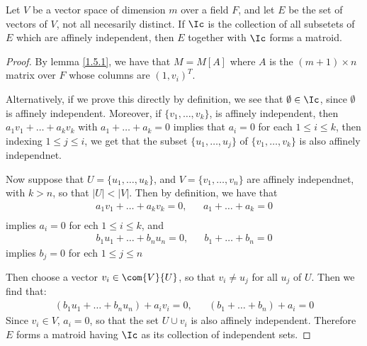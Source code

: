 \begin{lemma}\label{1.5.2}
    Let $V$ be a vector space of dimension $m$ over a field $F$, and let  $E$
    be the set of vectors of $V$, not all necesarily distinct. If $\Ic$ is the
    collection of all subsetets of  $E$ which are affinely independent, then
    $E$ together with  $\Ic$ forms a matroid.
\end{lemma}
\begin{proof}
    By lemma \ref{1.5.1}, we have that $M=M[A]$ where $A$ is the  $(m+1) \times
    n$ matrix over $F$ whose columns are  $(1,v_i)^T$.

    Alternatively, if we prove this directly by definition, we see that
    $\emptyset \in \Ic$, since  $\emptyset$ is affinely independent. Moreover,
    if  $\{v_1, \dots, v_k\}$, is affinely independent, then
    $a_1v_1+\dots+a_kv_k$ with $a_1+\dots+a_k=0$ implies that $a_i=0$ for each
    $1 \leq i \leq k$, then indexing  $1 \leq j \leq i$, we get that the subset
    $\{u_1, \dots, u_j\}$ of $\{v_1, \dots, v_k\}$ is also affinely independnet.

    Now suppose that $U=\{u_1, \dots, u_k\}$, and $V=\{v_1, \dots, v_n\}$ are
    affinely independnet, with $k>n$, so that  $|U|<|V|$. Then by definition, we
    have that
    \begin{align*}
        a_1v_1+\dots+a_kv_k=0,  &&   a_1+\dots+a_k=0 \\
    \end{align*}
    implies $a_i=0$ for ech $1 \leq i \leq k$, and
    \begin{align*}
        b_1u_1+\dots+b_nu_n=0,  &&  b_1+\dots+b_n=0
    \end{align*}
    implies $b_j=0$ for ech $1 \leq j \leq n$

    Then choose a vector $v_i \in \com{V}{U}$, so that $v_i \neq u_j$ for all
    $u_j$ of  $U$. Then we find that:
    \begin{align*}
        (b_1u_1+\dots+b_nu_n)+a_iv_i=0,  &&  (b_1+\dots+b_n)+a_i=0
    \end{align*}
    Since $v_i \in V$,  $a_i=0$, so that the set  $U \cup v_i$ is also affinely
    independent. Therefore $E$ forms a matroid having  $\Ic$ as its collection
    of independent sets.
\end{proof}

